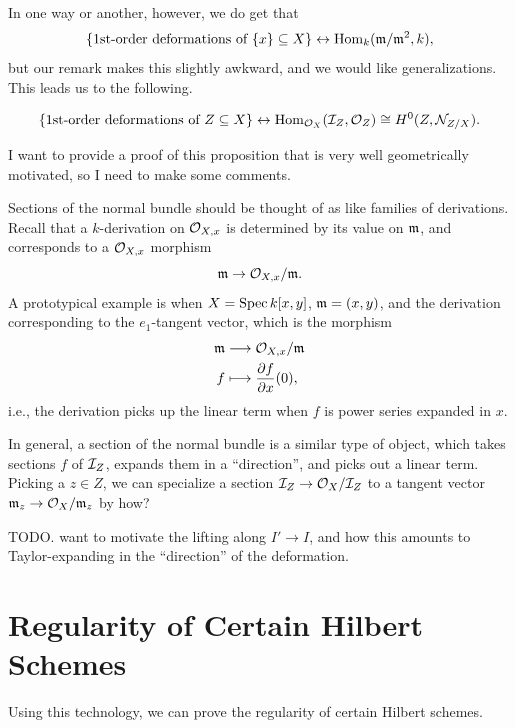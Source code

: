 \documentclass[12pt]{article}
\begin{document}
\begin{rmk}
    In one way or another, however, we do get that
    \[\{\text{1st-order deformations of $\{x\} \subseteq X$}\} \leftrightarrow \mathrm{Hom}_k(\mathfrak{m}/\mathfrak{m}^2,k),\]
    but our remark makes this slightly awkward, and we would like generalizations. This leads us to the following.
\end{rmk}

\begin{prop}
    \[\{\text{1st-order deformations of $Z\subseteq X$}\} \leftrightarrow \mathrm{Hom}_{\mathcal{O}_X}(\mathcal{I}_Z,\mathcal{O}_Z) \cong H^0(Z,\mathcal{N}_{Z/X}).\]
\end{prop}

I want to provide a proof of this proposition that is very well geometrically motivated, so I need to make some comments.

\begin{rmk}
    Sections of the normal bundle should be thought of as like families of derivations. Recall that a $k$-derivation on $\mathcal{O}_{X,x}$ is determined by its value on $\mathfrak{m}$, and corresponds to a $\mathcal{O}_{X,x}$ morphism
    \[\mathfrak{m} \to \mathcal{O}_{X,x}/\mathfrak{m}.\]
    A prototypical example is when $X=\operatorname{Spec} k[x,y]$, $\mathfrak{m}=(x,y)$, and the derivation corresponding to the $e_1$-tangent vector, which is the morphism
    \begin{align*}
        \mathfrak{m} &\longrightarrow \mathcal{O}_{X,x}/\mathfrak{m}\\
        f &\longmapsto \frac{\partial f}{\partial x}(0),
    \end{align*}
    i.e., the derivation picks up the linear term when $f$ is power series expanded in $x$.
    
    In general, a section of the normal bundle is a similar type of object, which takes sections $f$ of $\mathcal{I}_Z$, expands them in a ``direction'', and picks out a linear term. Picking a $z\in Z$, we can specialize a section $\mathcal{I}_Z\to \mathcal{O}_X/\mathcal{I}_Z$ to a tangent vector $\mathfrak{m}_z \to \mathcal{O}_X/\mathfrak{m}_z$ by {\color{red} how?}
\end{rmk}

{\color{red} TODO. want to motivate the lifting along $I'\to I$, and how this amounts to Taylor-expanding in the ``direction'' of the deformation.}




\section{Regularity of Certain Hilbert Schemes}

Using this technology, we can prove the regularity of certain Hilbert schemes.
\end{document}
